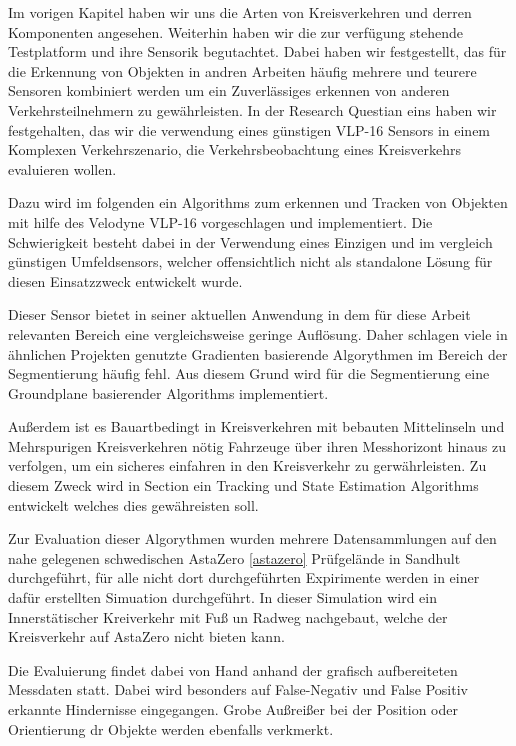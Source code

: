\documentclass[11pt,oneside,openright]{mpreport}
\begin{document}
Im vorigen Kapitel haben wir uns die Arten von Kreisverkehren und derren Komponenten angesehen.
Weiterhin haben wir die zur verfügung
stehende Testplatform und ihre Sensorik begutachtet. Dabei haben wir festgestellt, das für die Erkennung von Objekten in andren
Arbeiten häufig mehrere und teurere Sensoren kombiniert werden um ein Zuverlässiges erkennen von anderen Verkehrsteilnehmern zu gewährleisten.
In der Research Questian eins haben wir festgehalten, das wir die verwendung eines günstigen VLP-16 Sensors in einem 
Komplexen Verkehrszenario, die Verkehrsbeobachtung eines Kreisverkehrs evaluieren wollen.

Dazu wird im folgenden ein Algorithms zum erkennen und Tracken von Objekten mit hilfe des Velodyne VLP-16 vorgeschlagen
und implementiert. Die Schwierigkeit besteht dabei in der Verwendung eines Einzigen und im vergleich günstigen
Umfeldsensors, welcher offensichtlich nicht als standalone Lösung für diesen Einsatzzweck entwickelt wurde.

Dieser Sensor bietet in seiner aktuellen Anwendung in dem für diese Arbeit relevanten Bereich eine vergleichsweise
geringe Auflösung. Daher schlagen viele in ähnlichen Projekten genutzte Gradienten basierende Algorythmen im Bereich 
der Segmentierung häufig fehl.  Aus diesem Grund wird für die Segmentierung eine Groundplane basierender Algorithms implementiert.

Außerdem ist es Bauartbedingt in Kreisverkehren mit bebauten Mittelinseln und Mehrspurigen Kreisverkehren nötig
Fahrzeuge über ihren Messhorizont hinaus zu verfolgen, um ein sicheres einfahren in den Kreisverkehr zu gerwährleisten.
Zu diesem Zweck wird in Section  ein Tracking und State Estimation Algorithms entwickelt welches dies gewähreisten soll.

Zur Evaluation dieser Algorythmen wurden mehrere Datensammlungen auf den nahe gelegenen schwedischen AstaZero \cref{astazero} Prüfgelände in Sandhult
durchgeführt, für alle nicht dort durchgeführten Expirimente werden in einer dafür erstellten Simuation durchgeführt. In dieser Simulation
wird ein Innerstätischer Kreiverkehr mit Fuß un Radweg nachgebaut, welche der Kreisverkehr auf AstaZero nicht bieten kann.

Die Evaluierung findet dabei von Hand anhand der grafisch aufbereiteten Messdaten statt. Dabei wird besonders auf False-Negativ
und False Positiv erkannte Hindernisse eingegangen. Grobe Außreißer bei der Position oder Orientierung dr Objekte werden ebenfalls verkmerkt.
\end{document}

